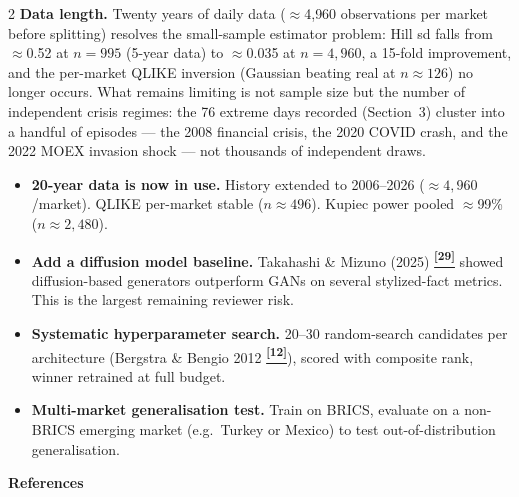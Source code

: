 \documentclass[10pt]{article}
\newcommand{\amberbox}[2]{\begin{tcolorbox}[mybox={Amber}{ABg},title={#1}]#2\end{tcolorbox}}
\newcommand{\tcite}[1]{%
  \hyperlink{R:#1}{\textsuperscript{\scriptsize\textbf{[#1]}}}}
\begin{document}
\begin{multicols}{2}
{\textbf{Data length.} Twenty years of daily data ($\approx$4{,}960 observations per market before splitting) resolves the small-sample estimator problem: Hill sd falls from $\approx$0.52 at $n=995$ (5-year data) to $\approx$0.035 at $n=4{,}960$, a 15-fold improvement, and the per-market QLIKE inversion (Gaussian beating real at $n\approx126$) no longer occurs. What remains limiting is not sample size but the number of independent crisis regimes: the 76 extreme days recorded (Section~3) cluster into a handful of episodes --- the 2008 financial crisis, the 2020 COVID crash, and the 2022 MOEX invasion shock --- not thousands of independent draws.}

\amberbox{Future Work}{%
\begin{itemize}
  \item \textbf{20-year data is now in use.} History extended to 2006--2026 ($\approx4{,}960$/market). QLIKE per-market stable ($n\approx496$). Kupiec power pooled $\approx$99\% ($n\approx2{,}480$).
  \item \textbf{Add a diffusion model baseline.} Takahashi \& Mizuno (2025)\tcite{29} showed diffusion-based generators outperform GANs on several stylized-fact metrics. This is the largest remaining reviewer risk.
  \item \textbf{Systematic hyperparameter search.} 20--30 random-search candidates per architecture (Bergstra \& Bengio 2012\tcite{12}), scored with composite rank, winner retrained at full budget.
  \item \textbf{Multi-market generalisation test.} Train on BRICS, evaluate on a non-BRICS emerging market (e.g.\ Turkey or Mexico) to test out-of-distribution generalisation.
\end{itemize}}

\end{multicols}

\clearpage

\begin{tcolorbox}[
  colback=NavyBg, colframe=NavyBg!60!black, arc=4pt,
  left=8pt, right=8pt, top=4pt, bottom=4pt,
  before skip=0pt, after skip=10pt]
{\large\bfseries\color{Navy} References}
\end{tcolorbox}
\end{document}
